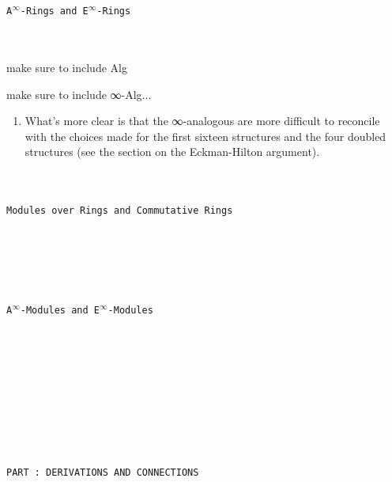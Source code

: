 \documentclass{book}
\theoremstyle{definition}
\newcounter{pcounter}
\renewcommand{\chapter}[1]{
\newpage
{
\Huge 
\begin{center}
\ \\
\ \\
\thispagestyle{empty}
\texttt{#1}
\end{center}}
\ \\
\ \\
}
\newcounter{partcount}
\renewcommand{\part}[1]{
\newpage
{
\Huge 
\begin{center}
\ \\
\ \\
\ \\
\ \\
\ \\
\ \\
\thispagestyle{empty}
\texttt{PART {\thepartcount}: #1}
\stepcounter{partcount}
\end{center}}
\ \\
\ \\
}
\begin{document}
\newpage
\chapter{A${}^{\infty}$-Rings and E${}^{\infty}$-Rings}

make sure to include Alg

make sure to include ∞-Alg...

\begin{enumerate}
\item What's more clear is that the ∞-analogous are more difficult to reconcile with the choices made for the first sixteen structures and the four doubled structures (see the section on the Eckman-Hilton argument).
\end{enumerate}


\newpage
\chapter{Modules over Rings and Commutative Rings}




\newpage
\chapter{A${}^{\infty}$-Modules and E${}^{\infty}$-Modules}





\part{DERIVATIONS AND CONNECTIONS}
\end{document}
